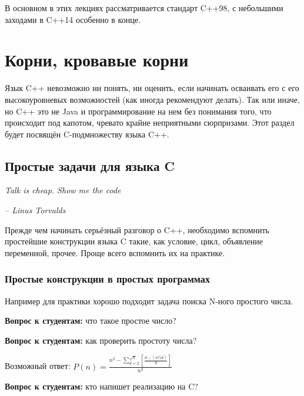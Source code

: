 \documentclass[a4paper,12pt,oneside]{article}
\newif\ifanswers
\begin{document}
В основном в этих лекциях рассматривается стандарт C++98, с небольшими заходами в C++14 особенно в конце.

\pagebreak
\section{Корни, кровавые корни}\label{BloodyRoots}

Язык C++ невозможно ни понять, ни оценить, если начинать осваивать его с его высокоуровневых возможностей (как иногда рекомендуют делать). Так или иначе, но C++ это не Java и программирование на нем без понимания того, что происходит под капотом, чревато крайне неприятными сюрпризами. Этот раздел будет посвящён C-подмножеству языка C++.

\subsection{Простые задачи для языка C}\label{PrimeTasks}

\hfill\textit{Talk is cheap. Show me the code}{\vspace{0.5em}}

\hfill\textit{-- Linus Torvalds}

Прежде чем начинать серьёзный разговор о C++, необходимо вспомнить простейшие конструкции языка C такие, как условие, цикл, объявление переменной, прочее. Проще всего вспомнить их на практике.

\subsubsection{Простые конструкции в простых программах}

Например для практики хорошо подходит задача поиска N-ного простого числа.

\textbf{Вопрос к студентам:} что такое простое число? 

\ifanswers
Правильный ответ: для целых чисел простыми являются несократимые (те которые делятся только на 1 и самих себя). В более общем случае простое число это такое, для которого из факта, что на него делится произведение всегда следует, что на него делится один из сомножителей.
\fi

\textbf{Вопрос к студентам:} как проверить простоту числа?

Возможный ответ: $P(n)=\frac{n^2-\sum\limits_{d=2}^{\sqrt{n}} [\frac{d-(n\%d)}{d}]}{n^2}$

\textbf{Вопрос к студентам:} кто напишет реализацию на C?
\end{document}
